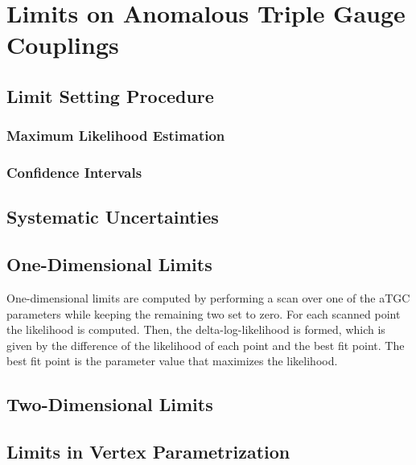 \chapter{Limits on Anomalous Triple Gauge Couplings}
\label{chap:LimitsonATGCs}


\section{Limit Setting Procedure}
\subsection{Maximum Likelihood Estimation}
\subsection{Confidence Intervals}
\section{Systematic Uncertainties}
\label{sec:systematics}
\section{One-Dimensional Limits}
One-dimensional limits are computed by performing a scan over one of the aTGC parameters while keeping the remaining two set to zero. For each scanned point the likelihood is computed. Then, the delta-log-likelihood is formed, which is given by the difference of the likelihood of each point and the best fit point. The best fit point is the parameter value that maximizes the likelihood.  
\section{Two-Dimensional Limits}
\section{Limits in Vertex Parametrization}
\label{sec:vertex}